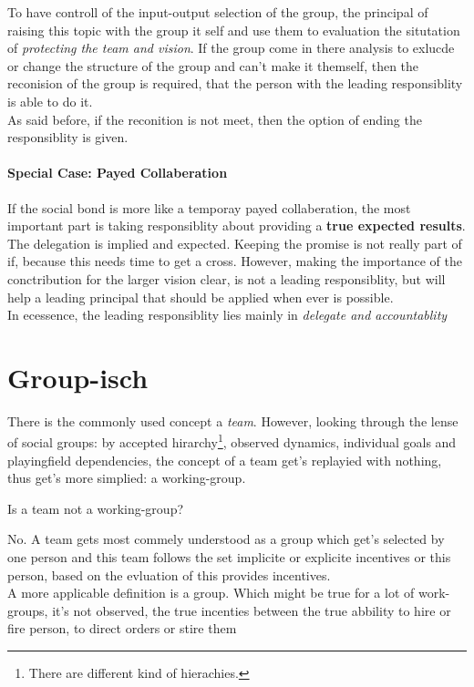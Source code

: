 To have controll of the input-output selection of the group, the principal of raising this topic with the group it self and use them to evaluation the situtation of \textit{protecting the team and vision}. If the group come in there analysis to exlucde or change the structure of the group and can't make it themself, then the reconision of the group is required, that the person with the leading responsiblity is able to do it.\\

As said before, if the reconition is not meet, then the option of ending the responsiblity is given.

\paragraph{Special Case: Payed Collaberation}
If the social bond is more like a temporay payed collaberation, the most important part is taking responsiblity about providing a \textbf{true expected results}. The delegation is implied and expected. Keeping the promise is not really part of if, because this needs time to get a cross. However, making the importance of the conctribution for the larger vision clear, is not a leading responsiblity, but will help a leading principal that should be applied when ever is possible.\\

In ecessence, the leading responsiblity lies mainly in \textit{delegate and accountablity}

\section{Group-isch}

There is the commonly used concept a \textit{team}. However, looking  through the lense of social groups: by accepted hirarchy\footnote{
	There are different kind of hierachies.
}, observed dynamics, individual goals and playingfield dependencies, the concept of a team get's replayied with nothing, thus get's more simplied: a working-group.

Is a team not a working-group? 

No. A team gets most commely understood as a group which get's selected by one person and this team follows the set implicite or explicite incentives or this person, based on the evluation of this provides incentives.\\


A more applicable definition is a group.
Which might be true for a lot of work-groups, it's not 
 observed, the true incenties between  the true abbility to hire or fire person, to direct orders or stire them 

